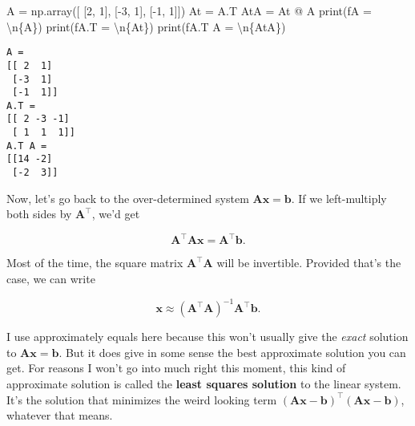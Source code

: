 \documentclass[
  letterpaper,
  DIV=11,
  numbers=noendperiod]{scrreprt}
\newenvironment{Shaded}{\begin{snugshade}}{\end{snugshade}}
\newcommand{\BuiltInTok}[1]{\textcolor[rgb]{0.00,0.23,0.31}{#1}}
\newcommand{\CharTok}[1]{\textcolor[rgb]{0.13,0.47,0.30}{#1}}
\newcommand{\DecValTok}[1]{\textcolor[rgb]{0.68,0.00,0.00}{#1}}
\newcommand{\NormalTok}[1]{\textcolor[rgb]{0.00,0.23,0.31}{#1}}
\newcommand{\OperatorTok}[1]{\textcolor[rgb]{0.37,0.37,0.37}{#1}}
\newcommand{\SpecialCharTok}[1]{\textcolor[rgb]{0.37,0.37,0.37}{#1}}
\newcommand{\SpecialStringTok}[1]{\textcolor[rgb]{0.13,0.47,0.30}{#1}}
\begin{document}
\begin{Shaded}
\begin{Highlighting}[]
\NormalTok{A }\OperatorTok{=}\NormalTok{ np.array([}
\NormalTok{    [}\DecValTok{2}\NormalTok{, }\DecValTok{1}\NormalTok{], }
\NormalTok{    [}\OperatorTok{{-}}\DecValTok{3}\NormalTok{, }\DecValTok{1}\NormalTok{], }
\NormalTok{    [}\OperatorTok{{-}}\DecValTok{1}\NormalTok{, }\DecValTok{1}\NormalTok{]])}
\NormalTok{At }\OperatorTok{=}\NormalTok{ A.T}
\NormalTok{AtA }\OperatorTok{=}\NormalTok{ At }\OperatorTok{@}\NormalTok{ A}
\BuiltInTok{print}\NormalTok{(}\SpecialStringTok{f\textquotesingle{}A = }\CharTok{\textbackslash{}n}\SpecialCharTok{\{}\NormalTok{A}\SpecialCharTok{\}}\SpecialStringTok{\textquotesingle{}}\NormalTok{)}
\BuiltInTok{print}\NormalTok{(}\SpecialStringTok{f\textquotesingle{}A.T = }\CharTok{\textbackslash{}n}\SpecialCharTok{\{}\NormalTok{At}\SpecialCharTok{\}}\SpecialStringTok{\textquotesingle{}}\NormalTok{)}
\BuiltInTok{print}\NormalTok{(}\SpecialStringTok{f\textquotesingle{}A.T A = }\CharTok{\textbackslash{}n}\SpecialCharTok{\{}\NormalTok{AtA}\SpecialCharTok{\}}\SpecialStringTok{\textquotesingle{}}\NormalTok{)}
\end{Highlighting}
\end{Shaded}

\begin{verbatim}
A = 
[[ 2  1]
 [-3  1]
 [-1  1]]
A.T = 
[[ 2 -3 -1]
 [ 1  1  1]]
A.T A = 
[[14 -2]
 [-2  3]]
\end{verbatim}

Now, let's go back to the over-determined system
\(\mathbf{A}\mathbf{x} = \mathbf{b}\). If we left-multiply both sides by
\(\mathbf{A}^\top\), we'd get

\[\mathbf{A}^\top \mathbf{A}\mathbf{x} = \mathbf{A}^\top \mathbf{b}.\]

Most of the time, the square matrix \(\mathbf{A}^\top \mathbf{A}\) will
be invertible. Provided that's the case, we can write

\[\mathbf{x} \approx (\mathbf{A}^\top \mathbf{A})^{-1} \mathbf{A}^\top \mathbf{b}.\]

I use approximately equals here because this won't usually give the
\emph{exact} solution to \(\mathbf{A}\mathbf{x} = \mathbf{b}\). But it
does give in some sense the best approximate solution you can get. For
reasons I won't go into much right this moment, this kind of approximate
solution is called the \textbf{least squares solution} to the linear
system. It's the solution that minimizes the weird looking term
\((\mathbf{A}\mathbf{x} - \mathbf{b})^\top (\mathbf{A}\mathbf{x} - \mathbf{b})\),
whatever that means.
\end{document}
